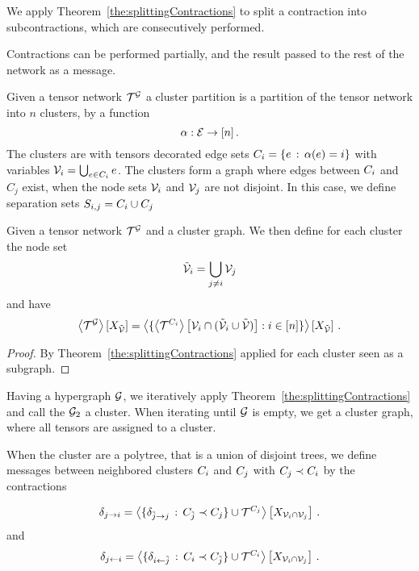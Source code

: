 We apply Theorem~\ref{the:splittingContractions} to split a contraction into subcontractions, which are consecutively performed.

Contractions can be performed partially, and the result passed to the rest of the network as a message.


\begin{definition}
	Given a tensor network $\extnet$ a cluster partition is a partition of the tensor network into $n$ clusters, by a function
		\[ \alpha : \edges \rightarrow [n] \, . \]
	The clusters are with tensors decorated edge sets $\enc = \{\edge \, : \, \alpha(\edge) = i\}$ with variables $\nodes_i = \bigcup_{\edge \in \enc} \edge$.
	The clusters form a graph where edges between $\enc$ and $C_j$ exist, when the node sets $\nodes_i$ and $\nodes_j$ are not disjoint.
	In this case, we define separation sets $S_{i,j}=\enc\cup C_j$
\end{definition}

\begin{theorem}
	Given a tensor network $\extnet$ and a cluster graph.
	We then define for each cluster the node set
		\[ \tilde{\nodes}_i = \bigcup_{j\neq i} \nodes_j \]
	and have
		\[ \contractionof{\extnet}{\catvariableof{\secnodes}} = 
		\contractionof{
			\{ \contractionof{ \tnetof{\enc} }{\nodes_i \cap (\tilde{\nodes}_i\cup\secnodes)}  : i \in [n]\}
		}{\catvariableof{\secnodes}}  \, . \]
\end{theorem}
\begin{proof}
	By Theorem~\ref{the:splittingContractions} applied for each cluster seen as a subgraph.
\end{proof}




Having a hypergraph $\graph$, we iteratively apply Theorem~\ref{the:splittingContractions} and call the $\graph_2$ a cluster.
When iterating until $\graph$ is empty, we get a cluster graph, where all tensors are assigned to a cluster.


When the cluster are a polytree, that is a union of disjoint trees, we define messages between neighbored clusters $\enc$ and $\secenc$ with $\secenc\prec\enc$ by the contractions

\begin{align}
	\upmes{j}{i} = \contractionof{\{\upmes{\tilde{j}}{j} \, : \,  \thirdenc \prec \secenc\} \cup \tnetof{\secenc}}{\catvariableof{\nodes_i\cap \nodes_j}} \, .
\end{align}
and
\begin{align}
	\downmes{i}{j}  = \contractionof{\{\downmes{\tilde{j}}{i} \, : \,  \enc \prec  \thirdenc\} \cup \tnetof{\enc}}{\catvariableof{\nodes_i\cap \nodes_j}} \, .
\end{align}


